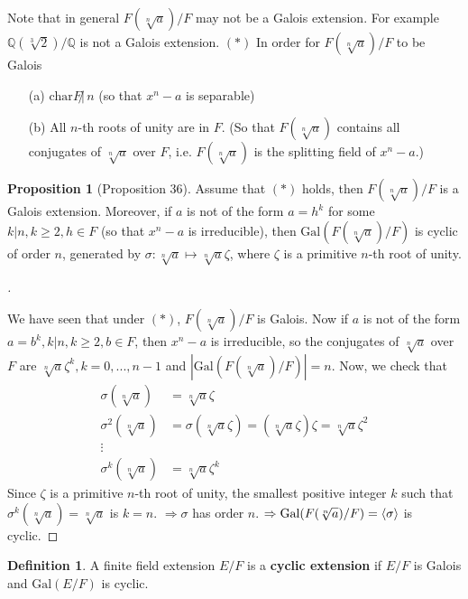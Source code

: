 \documentclass{article}
\theoremstyle{definition}
\newtheorem{dfn}{Definition}
\newtheorem{prop}{Proposition}
\newenvironment{proofs}[1][\proofname]{%
  \begin{proof}[#1]$ $\par\nobreak\ignorespaces
}{%
  \end{proof}
}
\newcommand{\QQ}{\mathbb Q}
\newcommand{\Ra}{\Rightarrow}
\newcommand{\Gal}{\text{Gal}}
\newcommand{\cha}{\text{char}}
\begin{document}
Note that in general $F(\sqrt[n]{a})/F$ may not be a Galois extension.
For example $\QQ(\sqrt[3]{2})/\QQ$ is not a Galois extension.
$(*)$ In order for $F(\sqrt[n]{a})/F$ to be Galois 
\begin{enumerate}
	\item[(a)] $\cha F \not| \, n$ (so that $x^n - a$ is separable)

	\item[(b)] All $n$-th roots of unity are in $F$. 
		(So that $F(\sqrt[n]{a})$ contains all conjugates of $\sqrt[n]{a}$ over $F$, i.e. $F(\sqrt[n]{a})$ is the splitting field of $x^n - a$.)
\end{enumerate}

\begin{prop}[Proposition 36]
	Assume that $(*)$ holds, then $F(\sqrt[n]{a})/F$ is a Galois extension.
	Moreover, if $a$ is not of the form $a = h^k$ for some $k| n, k \geq 2, h \in F$ (so that $x^n - a$ is irreducible), then $\Gal(F(\sqrt[n]{a})/F)$ is cyclic of order $n$, generated by $\sigma: \sqrt[n]{a} \mapsto \sqrt[n]{a} \zeta$, where $\zeta$ is a primitive $n$-th root of unity.
\end{prop}

\begin{proofs}
	We have seen that under $(*)$, $F(\sqrt[n]{a})/F$ is Galois.
	Now if $a$ is not of the form $a = b^k, k | n, k \geq 2, b \in F$, then $x^n - a$ is irreducible, so the conjugates of $\sqrt[n]{a}$ over $F$ are $\sqrt[n]{a} \zeta^k, k = 0, ..., n - 1$ and $|\Gal(F(\sqrt[n]{a})/F)| = n$.
	Now, we check that
	\begin{align*}
		\sigma(\sqrt[n]{a}) &= \sqrt[n]{a} \zeta\\
		\sigma^2 (\sqrt[n]{a}) &= \sigma (\sqrt[n]{a} \zeta) = (\sqrt[n]{a} \zeta) \zeta = \sqrt[n]{a} \zeta^2\\
		\vdots\\
		\sigma^k(\sqrt[n]{a}) &= \sqrt[n]{a} \zeta^k
	\end{align*}
	Since $\zeta$ is a primitive $n$-th root of unity, the smallest positive integer $k$ such that $\sigma^k(\sqrt[n]{a}) = \sqrt[n]{a}$ is $k = n$.
	$\Ra \sigma$ has order $n$.
	$\Ra \Gal(F(\sqrt[n]{a})/F) = \ev{\sigma}$ is cyclic.
\end{proofs}

\begin{dfn}
	A finite field extension $E/F$ is a \textbf{cyclic extension} if $E/F$ is Galois and $\Gal(E/F)$ is cyclic.
\end{dfn}
\end{document}
